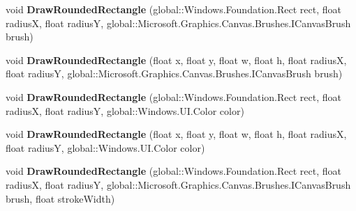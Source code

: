 \begin{DoxyCompactItemize}
\item 
\mbox{\label{interface_microsoft_1_1_graphics_1_1_canvas_1_1_i_canvas_drawing_session_a9d0d5982cb35d8ea63a4e8c9878c2fc4}} 
void {\bfseries Draw\+Rounded\+Rectangle} (global\+::\+Windows.\+Foundation.\+Rect rect, float radiusX, float radiusY, global\+::\+Microsoft.\+Graphics.\+Canvas.\+Brushes.\+I\+Canvas\+Brush brush)
\item 
\mbox{\label{interface_microsoft_1_1_graphics_1_1_canvas_1_1_i_canvas_drawing_session_a70be22ced94e9f343568d5bb37eb2867}} 
void {\bfseries Draw\+Rounded\+Rectangle} (float x, float y, float w, float h, float radiusX, float radiusY, global\+::\+Microsoft.\+Graphics.\+Canvas.\+Brushes.\+I\+Canvas\+Brush brush)
\item 
\mbox{\label{interface_microsoft_1_1_graphics_1_1_canvas_1_1_i_canvas_drawing_session_a51d1664608a745f34514157c95465798}} 
void {\bfseries Draw\+Rounded\+Rectangle} (global\+::\+Windows.\+Foundation.\+Rect rect, float radiusX, float radiusY, global\+::\+Windows.\+U\+I.\+Color color)
\item 
\mbox{\label{interface_microsoft_1_1_graphics_1_1_canvas_1_1_i_canvas_drawing_session_a8aafbc2f552134498d59d2eb75342ef0}} 
void {\bfseries Draw\+Rounded\+Rectangle} (float x, float y, float w, float h, float radiusX, float radiusY, global\+::\+Windows.\+U\+I.\+Color color)
\item 
\mbox{\label{interface_microsoft_1_1_graphics_1_1_canvas_1_1_i_canvas_drawing_session_ab24f3eef9aea1a4a6eb20752d4bca24f}} 
void {\bfseries Draw\+Rounded\+Rectangle} (global\+::\+Windows.\+Foundation.\+Rect rect, float radiusX, float radiusY, global\+::\+Microsoft.\+Graphics.\+Canvas.\+Brushes.\+I\+Canvas\+Brush brush, float stroke\+Width)
\item 
\mbox{\label{interface_microsoft_1_1_graphics_1_1_canvas_1_1_i_canvas_drawing_session_abca20a3d8cdd540a5b30f61043335a5f}} 

\end{DoxyCompactItemize}
